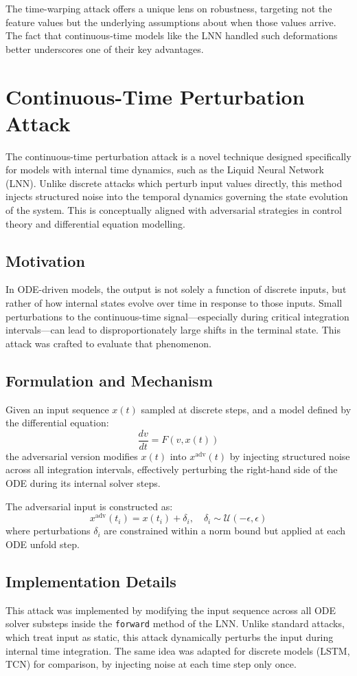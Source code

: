 The time-warping attack offers a unique lens on robustness, targeting not the feature values but the underlying assumptions about when those values arrive. The fact that continuous-time models like the LNN handled such deformations better underscores one of their key advantages.

\section{Continuous-Time Perturbation Attack}

The continuous-time perturbation attack is a novel technique designed specifically for models with internal time dynamics, such as the Liquid Neural Network (LNN). Unlike discrete attacks which perturb input values directly, this method injects structured noise into the temporal dynamics governing the state evolution of the system. This is conceptually aligned with adversarial strategies in control theory and differential equation modelling.

\subsection{Motivation}
In ODE-driven models, the output is not solely a function of discrete inputs, but rather of how internal states evolve over time in response to those inputs. Small perturbations to the continuous-time signal—especially during critical integration intervals—can lead to disproportionately large shifts in the terminal state. This attack was crafted to evaluate that phenomenon.

\subsection{Formulation and Mechanism}
Given an input sequence $x(t)$ sampled at discrete steps, and a model defined by the differential equation:
\[
\frac{dv}{dt} = F(v, x(t))
\]
the adversarial version modifies $x(t)$ into $x^{\text{adv}}(t)$ by injecting structured noise across all integration intervals, effectively perturbing the right-hand side of the ODE during its internal solver steps.

The adversarial input is constructed as:
\[
x^{\text{adv}}(t_i) = x(t_i) + \delta_i, \quad \delta_i \sim \mathcal{U}(-\epsilon, \epsilon)
\]
where perturbations $\delta_i$ are constrained within a norm bound but applied at each ODE unfold step.

\subsection{Implementation Details}
This attack was implemented by modifying the input sequence across all ODE solver substeps inside the \texttt{forward} method of the LNN. Unlike standard attacks, which treat input as static, this attack dynamically perturbs the input during internal time integration. The same idea was adapted for discrete models (LSTM, TCN) for comparison, by injecting noise at each time step only once.

